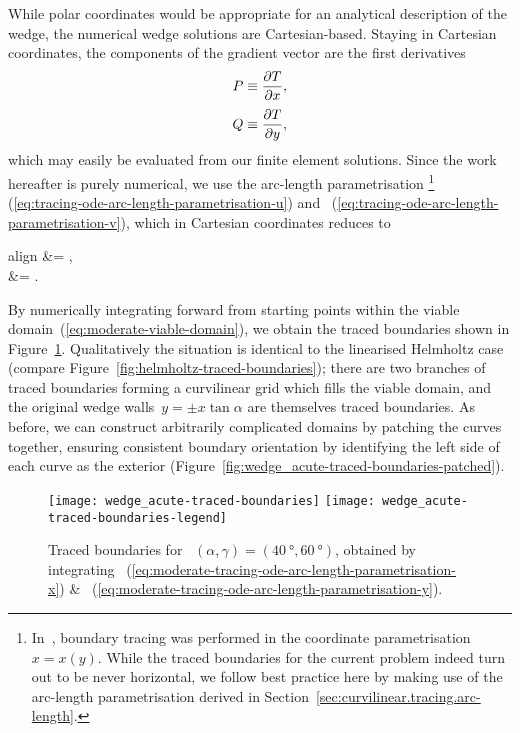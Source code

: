 While polar coordinates would be appropriate
for an analytical description of the wedge,
the numerical wedge solutions are Cartesian-based.
Staying in Cartesian coordinates,
the components of the gradient vector
are the first derivatives
\begin{align}
  P &\ideq \pder{T}{x},
    \label{eq:moderate-gradient-x-component} \\[\tallspace]
  Q &\ideq \pder{T}{y},
    \label{eq:moderate-gradient-y-component}
\end{align}
which may easily be evaluated from our finite element solutions.
Since the work hereafter is purely numerical,
we use the arc-length parametrisation%
\footnote{
  In~\cite{li-2017-thesis-rounding-capillary-wedge},
  boundary tracing was performed in the coordinate parametrisation~$x = x (y)$.
  While the traced boundaries for the current problem
  indeed turn out to be never horizontal,
  we follow best practice here
  by making use of the arc-length parametrisation
  derived in Section~\ref{sec:curvilinear.tracing.arc-length}.
}~%
  (\ref{eq:tracing-ode-arc-length-parametrisation-u})
and~%
  (\ref{eq:tracing-ode-arc-length-parametrisation-v}),
which in Cartesian coordinates reduces to
\begin{important}{align}
   &= ,
    \label{eq:moderate-tracing-ode-arc-length-parametrisation-x} \\[\tallspace]
   &= .
    \label{eq:moderate-tracing-ode-arc-length-parametrisation-y}
\end{important}
By numerically integrating forward from starting points
within the viable domain~(\ref{eq:moderate-viable-domain}),
we obtain the traced boundaries shown
in Figure~\ref{fig:wedge_acute-traced-boundaries}.
Qualitatively the situation is identical
to the linearised Helmholtz case
(compare Figure~\ref{fig:helmholtz-traced-boundaries});
there are two branches of traced boundaries
forming a curvilinear grid which fills the viable domain,
and the original wedge walls~$y = \pm x \tan\alpha$
are themselves traced boundaries.
As before, we can construct arbitrarily complicated domains
by patching the curves together,
ensuring consistent boundary orientation
by identifying the left side of each curve as the exterior
(Figure~\ref{fig:wedge_acute-traced-boundaries-patched}).

\begin{figure}
  \newcommand*{\legendoffsetheight}{0.34\textwidth}
  \centering
  \texttt{[image: wedge\_acute-traced-boundaries]}
  \texttt{[image: wedge\_acute-traced-boundaries-legend]}
  \caption{
    Traced boundaries for~%
      $(\alpha, \gamma) = (\SI{40}{\degree}, \SI{60}{\degree})$,
    obtained by integrating~%
      (\ref{eq:moderate-tracing-ode-arc-length-parametrisation-x})
    \&~%
      (\ref{eq:moderate-tracing-ode-arc-length-parametrisation-y}).
  }
  \label{fig:wedge_acute-traced-boundaries}
\end{figure}

